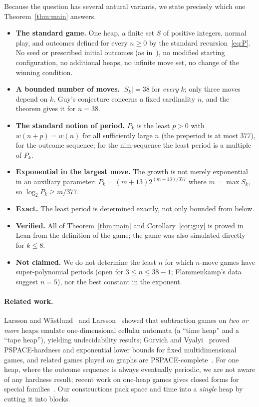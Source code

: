 \documentclass[11pt]{article}
\theoremstyle{definition}
\newcommand{\nmoves}{38}
\begin{document}
Because the question has several natural variants, we state precisely which one Theorem~\ref{thm:main}
answers.
\begin{itemize}[leftmargin=*]
\item \textbf{The standard game.}  One heap, a finite set $S$ of positive integers, normal play, and
outcomes defined for every $n\ge0$ by the standard recursion~\eqref{eq:P}.  No seed or prescribed
initial outcomes (as in~\cite{MP}), no modified starting configuration, no additional heaps, no
infinite move set, no change of the winning condition.
\item \textbf{A bounded number of moves.}  $|S_k|=\nmoves$ for \emph{every} $k$; only three moves depend on
$k$.  Guy's conjecture concerns a fixed cardinality $n$, and the theorem gives it for $n=\nmoves$.
\item \textbf{The standard notion of period.}  $P_k$ is the least $p>0$ with $w(n+p)=w(n)$ for all
sufficiently large $n$ (the preperiod is at most $377$), for the outcome sequence; for the
nim-sequence the least period is a multiple of $P_k$.
\item \textbf{Exponential in the largest move.}  The growth is not merely exponential in an auxiliary
parameter: $P_k=(m+13)2^{(m+13)/377}$ where $m=\max S_k$, so $\log_2 P_k\ge m/377$.
\item \textbf{Exact.}  The least period is determined exactly, not only bounded from below.
\item \textbf{Verified.}  All of Theorem~\ref{thm:main} and Corollary~\ref{cor:guy} is proved in Lean
from the definition of the game; the game was also simulated directly for $k\le 8$.
\item \textbf{Not claimed.}  We do not determine the least $n$ for which $n$-move games have
super-polynomial periods (open for $3\le n\le \nmoves-1$; Flammenkamp's data suggest $n=5$), nor the best
constant in the exponent.
\end{itemize}

\paragraph{Related work.}  Larsson and Wästlund~\cite{LW} and Larsson~\cite{L12} showed that
subtraction games on \emph{two or more} heaps emulate one-dimensional cellular automata (a ``time
heap'' and a ``tape heap''), yielding undecidability results; Gurvich and Vyalyi~\cite{GV} proved
PSPACE-hardness and exponential lower bounds for fixed multidimensional games, and related games
played on graphs are PSPACE-complete~\cite{DGPS}.  For one heap, where the outcome sequence is always
eventually periodic, we are not aware of any hardness result; recent work on one-heap games gives
closed forms for special families~\cite{LM,LS}.  Our constructions pack space and time into a
\emph{single} heap by cutting it into blocks.
\end{document}
